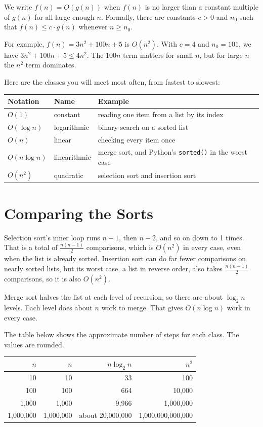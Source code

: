 We write $f(n) = O(g(n))$ when $f(n)$ is no larger than a constant multiple of
$g(n)$ for all large enough $n$. Formally, there are constants $c > 0$ and
$n_0$ such that $f(n) \leq c \cdot g(n)$ whenever $n \geq n_0$.

For example, $f(n) = 3n^2 + 100n + 5$ is $O(n^2)$. With $c = 4$ and
$n_0 = 101$, we have $3n^2 + 100n + 5 \leq 4n^2$. The $100n$ term matters for
small $n$, but for large $n$ the $n^2$ term dominates.

Here are the classes you will meet most often, from fastest to slowest:

\begin{center}
\begin{tabular}{|l|l|p{6cm}|}
\hline
Notation & Name & Example \\
\hline
$O(1)$ & constant & reading one item from a list by its index \\
\hline
$O(\log n)$ & logarithmic & binary search on a sorted list \\
\hline
$O(n)$ & linear & checking every item once \\
\hline
$O(n \log n)$ & linearithmic & merge sort, and Python's \texttt{sorted()} in the worst case \\
\hline
$O(n^2)$ & quadratic & selection sort and insertion sort \\
\hline
\end{tabular}
\end{center}

\section{Comparing the Sorts}
Selection sort's inner loop runs $n - 1$, then $n - 2$, and so on down to 1
times. That is a total of $\frac{n(n-1)}{2}$ comparisons, which is
$O(n^2)$ in every case, even when the list is already sorted. Insertion sort
can do far fewer comparisons on nearly sorted lists, but its worst case, a
list in reverse order, also takes $\frac{n(n-1)}{2}$ comparisons, so it is also
$O(n^2)$.

Merge sort halves the list at each level of recursion, so there are about
$\log_2 n$ levels. Each level does about $n$ work to merge. That gives
$O(n \log n)$ work in every case.

The table below shows the approximate number of steps for each class. The
values are rounded.

\begin{center}
\begin{tabular}{|r|r|r|r|}
\hline
$n$ & $n$ & $n \log_2 n$ & $n^2$ \\
\hline
10 & 10 & 33 & 100 \\
\hline
100 & 100 & 664 & 10,000 \\
\hline
1,000 & 1,000 & 9,966 & 1,000,000 \\
\hline
1,000,000 & 1,000,000 & about 20,000,000 & 1,000,000,000,000 \\
\hline
\end{tabular}
\end{center}


